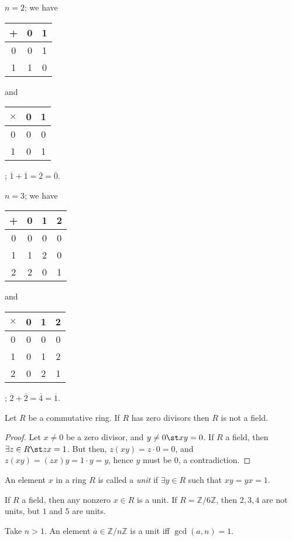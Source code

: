 \documentclass[12pt,oneside]{article}
\begin{document}
\begin{example}
  $n = 2$; we have \begin{tabular}{c|cc}
    + & 0 & 1\\
    \hline
    0 & 0 & 1\\
    \hline
    1 & 1 & 0
  \end{tabular} and \begin{tabular}{c | cc}
    $\times$ & 0 & 1\\
    \hline
    0 & 0 & 0\\
    \hline
    1 & 0 & 1
  \end{tabular};
  $\overline{1} + \overline{1} = \overline{2} = \overline{0}$.
\end{example}
\begin{example}
  $n = 3$; we have \begin{tabular}{c|ccc}
    + & 0 & 1 & 2\\
    \hline
    0 & 0 & 0 & 0 \\
    \hline
    1 & 1 & 2 & 0\\
    \hline
    2 & 2 & 0 & 1
  \end{tabular}
  and \begin{tabular}{c|ccc}
    $\times$ & 0 & 1 & 2\\
    \hline
    0 & 0 & 0 & 0\\
    \hline
    1 & 0 & 1 & 2\\
    \hline
    2 & 0 & 2 & 1
  \end{tabular}; $\overline{2} + \overline{2} = \overline{4} = \overline{1}$.
\end{example}

\begin{lemma}
  Let $R$ be a commutative ring. If $R$ has zero divisors then $R$ is not a field.
\end{lemma}

\begin{proof}
  Let $x \neq 0$ be a zero divisor, and $y \neq 0 \st xy = 0$. If $R$ a field, then $\exists z \in R \st zx = 1$. But then, $z(xy) = z \cdot 0 = 0$, and $z(xy) = (zx)y = 1\cdot y = y$, hence $y$ must be 0, a contradiction.
\end{proof}
\begin{definition}[Unit]
  An element $x$ in a ring $R$ is called a \emph{unit} if $\exists y \in R$ such that $xy = yx = 1$.
\end{definition}
\begin{example}
  If $R$ a field, then any nonzero $x \in R$ is a unit. If $R = \mathbb{Z}/6\mathbb{Z}$, then $2,3,4$ are not units, but $1$ and $5$ are units.
\end{example}
\begin{proposition}
  Take $n > 1$. An element $\overline{a} \in \mathbb{Z}/n\mathbb{Z}$ is a unit iff $\gcd(a,n) = 1$.
\end{proposition}
\end{document}
